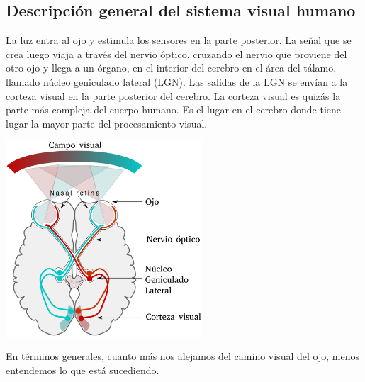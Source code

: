 \subsection{Descripción general del sistema visual humano}
La luz entra al ojo y estimula los sensores en la parte posterior. 
La señal que se crea luego viaja a través del nervio óptico, cruzando el 
nervio que proviene del otro ojo y llega a un órgano, en el interior del 
cerebro en el área del tálamo, llamado núcleo geniculado lateral (LGN). 
Las salidas de la LGN se envían a la corteza visual en la parte posterior del cerebro. 
La corteza visual es quizás la parte más compleja del cuerpo humano. Es el lugar en el 
cerebro donde tiene lugar la mayor parte del procesamiento visual.~\cite{anilbharath2008}
\begin{center}
    \includegraphics[width=0.55\textwidth]{Capitulo2/Fig1_1.eps}       
    \label{Fig1_1}
\end{center}
En términos generales, cuanto más nos alejamos del camino visual del ojo, menos 
entendemos lo que está sucediendo.
